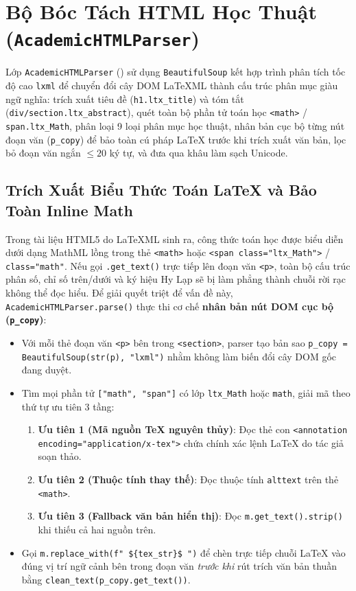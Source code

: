 \section{Bộ Bóc Tách HTML Học Thuật (\texttt{AcademicHTMLParser})}
\label{sec:ch2_html_parser}

Lớp \texttt{AcademicHTMLParser} () sử dụng \texttt{BeautifulSoup} kết hợp trình phân tích tốc độ cao \texttt{lxml} để chuyển đổi cây DOM LaTeXML thành cấu trúc phân mục giàu ngữ nghĩa: trích xuất tiêu đề (\texttt{h1.ltx\_title}) và tóm tắt (\texttt{div/section.ltx\_abstract}), quét toàn bộ phần tử toán học \texttt{<math>} / \texttt{span.ltx\_Math}, phân loại 9 loại phân mục học thuật, nhân bản cục bộ từng nút đoạn văn (\texttt{p\_copy}) để bảo toàn cú pháp LaTeX trước khi trích xuất văn bản, lọc bỏ đoạn văn ngắn $\le 20$ ký tự, và đưa qua khâu làm sạch Unicode.

\subsection{Trích Xuất Biểu Thức Toán LaTeX và Bảo Toàn Inline Math}
\label{sec:ch2_latex_math}

Trong tài liệu HTML5 do LaTeXML sinh ra, công thức toán học được biểu diễn dưới dạng MathML lồng trong thẻ \texttt{<math>} hoặc \texttt{<span class="ltx\_Math">} / \texttt{class="math"}. Nếu gọi \texttt{.get\_text()} trực tiếp lên đoạn văn \texttt{<p>}, toàn bộ cấu trúc phân số, chỉ số trên/dưới và ký hiệu Hy Lạp sẽ bị làm phẳng thành chuỗi rời rạc không thể đọc hiểu. Để giải quyết triệt để vấn đề này, \texttt{AcademicHTMLParser.parse()} thực thi cơ chế \textbf{nhân bản nút DOM cục bộ (\texttt{p\_copy})}:
\begin{itemize}
  \item Với mỗi thẻ đoạn văn \texttt{<p>} bên trong \texttt{<section>}, parser tạo bản sao \texttt{p\_copy = BeautifulSoup(str(p), "lxml")} nhằm không làm biến đổi cây DOM gốc đang duyệt.
  \item Tìm mọi phần tử \texttt{["math", "span"]} có lớp \texttt{ltx\_Math} hoặc \texttt{math}, giải mã theo thứ tự ưu tiên 3 tầng:
    \begin{enumerate}[label=\textbf{\arabic*.}]
      \item \textbf{Ưu tiên 1 (Mã nguồn TeX nguyên thủy)}: Đọc thẻ con \texttt{<annotation encoding="application/x-tex">} chứa chính xác lệnh LaTeX do tác giả soạn thảo.
      \item \textbf{Ưu tiên 2 (Thuộc tính thay thế)}: Đọc thuộc tính \texttt{alttext} trên thẻ \texttt{<math>}.
      \item \textbf{Ưu tiên 3 (Fallback văn bản hiển thị)}: Đọc \texttt{m.get\_text().strip()} khi thiếu cả hai nguồn trên.
    \end{enumerate}
  \item Gọi \texttt{m.replace\_with(f" \$\{tex\_str\}\$ ")} để chèn trực tiếp chuỗi LaTeX vào đúng vị trí ngữ cảnh bên trong đoạn văn \textit{trước khi} rút trích văn bản thuần bằng \texttt{clean\_text(p\_copy.get\_text())}.
\end{itemize}

